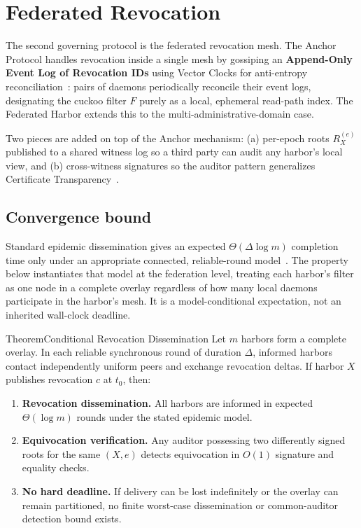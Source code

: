 \documentclass[11pt,a4paper]{article}
\theoremstyle{definition}
\theoremstyle{remark}
\begin{document}
\section{Federated Revocation}\label{sec:fh-revocation}

The second governing protocol is the federated revocation mesh. The Anchor Protocol handles revocation inside a single mesh by gossiping an \textbf{Append-Only Event Log of Revocation IDs} using Vector Clocks for anti-entropy reconciliation~: pairs of daemons periodically reconcile their event logs, designating the cuckoo filter $F$ purely as a local, ephemeral read-path index. The Federated Harbor extends this to the multi-administrative-domain case.

Two pieces are added on top of the Anchor mechanism: (a) per-epoch roots $R_X^{(e)}$ published to a shared witness log so a third party can audit any harbor's local view, and (b) cross-witness signatures so the auditor pattern generalizes Certificate Transparency~.



\subsection{Convergence bound}\label{sec:fh-conv-bound}

Standard epidemic dissemination gives an expected $\Theta(\Delta \log m)$ completion time only under an appropriate connected, reliable-round model~. The property below instantiates that model at the federation level, treating each harbor's filter as one node in a complete overlay regardless of how many local daemons participate in the harbor's mesh. It is a model-conditional expectation, not an inherited wall-clock deadline.

\begin{pdclaim}{Theorem}{Conditional Revocation Dissemination}
\setlength{\parskip}{4pt plus 1pt}
\label{thm:fh-conv}
Let $m$ harbors form a complete overlay. In each reliable synchronous round of duration $\Delta$, informed harbors contact independently uniform peers and exchange revocation deltas. If harbor $X$ publishes revocation $c$ at $t_0$, then:
\begin{enumerate}[nosep]
\item \textbf{Revocation dissemination.} All harbors are informed in expected $\Theta(\log m)$ rounds under the stated epidemic model.
\item \textbf{Equivocation verification.} Any auditor possessing two differently signed roots for the same $(X,e)$ detects equivocation in $O(1)$ signature and equality checks.
\item \textbf{No hard deadline.} If delivery can be lost indefinitely or the overlay can remain partitioned, no finite worst-case dissemination or common-auditor detection bound exists.
\end{enumerate}
\end{pdclaim}
\end{document}
